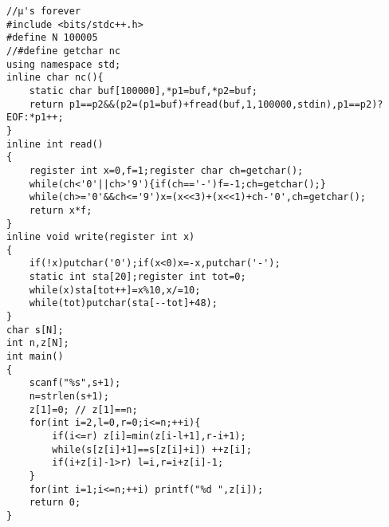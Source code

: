 \begin{verbatim}
//μ's forever
#include <bits/stdc++.h>
#define N 100005
//#define getchar nc
using namespace std;
inline char nc(){
    static char buf[100000],*p1=buf,*p2=buf;
    return p1==p2&&(p2=(p1=buf)+fread(buf,1,100000,stdin),p1==p2)?EOF:*p1++;
}
inline int read()
{
    register int x=0,f=1;register char ch=getchar();
    while(ch<'0'||ch>'9'){if(ch=='-')f=-1;ch=getchar();}
    while(ch>='0'&&ch<='9')x=(x<<3)+(x<<1)+ch-'0',ch=getchar();
    return x*f;
}
inline void write(register int x)
{
    if(!x)putchar('0');if(x<0)x=-x,putchar('-');
    static int sta[20];register int tot=0;
    while(x)sta[tot++]=x%10,x/=10;
    while(tot)putchar(sta[--tot]+48);
}
char s[N];
int n,z[N];
int main()
{
    scanf("%s",s+1);
    n=strlen(s+1);
    z[1]=0; // z[1]==n;
    for(int i=2,l=0,r=0;i<=n;++i){
        if(i<=r) z[i]=min(z[i-l+1],r-i+1);
        while(s[z[i]+1]==s[z[i]+i]) ++z[i];
        if(i+z[i]-1>r) l=i,r=i+z[i]-1;
    }
    for(int i=1;i<=n;++i) printf("%d ",z[i]);
    return 0;
}
\end{verbatim}
